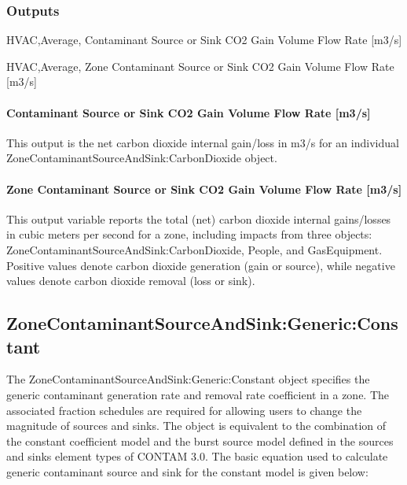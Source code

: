 \subsubsection{Outputs}\label{outputs-6-004}

HVAC,Average, Contaminant Source or Sink CO2 Gain Volume Flow Rate {[}m3/s{]}

HVAC,Average, Zone Contaminant Source or Sink CO2 Gain Volume Flow Rate {[}m3/s{]}

\paragraph{Contaminant Source or Sink CO2 Gain Volume Flow Rate {[}m3/s{]}}\label{contaminant-source-or-sink-co2-gain-volume-flow-rate-m3s}

This output is the net carbon dioxide internal gain/loss in m3/s for an individual ZoneContaminantSourceAndSink:CarbonDioxide object.

\paragraph{Zone Contaminant Source or Sink CO2 Gain Volume Flow Rate {[}m3/s{]}}\label{zone-contaminant-source-or-sink-co2-gain-volume-flow-rate-m3s}

This output variable reports the total (net) carbon dioxide internal gains/losses in cubic meters per second for a zone, including impacts from three objects: ZoneContaminantSourceAndSink:CarbonDioxide, People, and GasEquipment. Positive values denote carbon dioxide generation (gain or source), while negative values denote carbon dioxide removal (loss or sink).

\subsection{ZoneContaminantSourceAndSink:Generic:Constant}\label{zonecontaminantsourceandsinkgenericconstant}

The ZoneContaminantSourceAndSink:Generic:Constant object specifies the generic contaminant generation rate and removal rate coefficient in a zone. The associated fraction schedules are required for allowing users to change the magnitude of sources and sinks. The object is equivalent to the combination of the constant coefficient model and the burst source model defined in the sources and sinks element types of CONTAM 3.0. The basic equation used to calculate generic contaminant source and sink for the constant model is given below:

